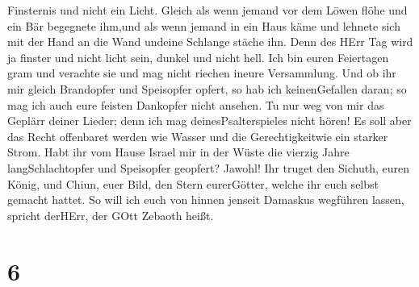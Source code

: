 Finsternis und nicht ein Licht.  Gleich als wenn jemand vor
dem Löwen flöhe und ein Bär begegnete ihm,und als wenn jemand in ein
Haus käme und lehnete sich mit der Hand an die Wand undeine Schlange
stäche ihn.  Denn des HErr Tag wird ja finster und nicht
licht sein, dunkel und nicht hell.  Ich bin euren
Feiertagen gram und verachte sie und mag nicht riechen ineure
Versammlung.  Und ob ihr mir gleich Brandopfer und
Speisopfer opfert, so hab ich keinenGefallen daran; so mag ich auch eure
feisten Dankopfer nicht ansehen.  Tu nur weg von mir das
Geplärr deiner Lieder; denn ich mag deinesPsalterspieles nicht hören!
 Es soll aber das Recht offenbaret werden wie Wasser und
die Gerechtigkeitwie ein starker Strom.  Habt ihr vom Hause
Israel mir in der Wüste die vierzig Jahre langSchlachtopfer und
Speisopfer geopfert? Jawohl!  Ihr truget den Sichuth, euren
König, und Chiun, euer Bild, den Stern eurerGötter, welche ihr euch
selbst gemacht hattet.  So will ich euch von hinnen jenseit
Damaskus wegführen lassen, spricht derHErr, der GOtt Zebaoth heißt.

\hypertarget{section-5}{%
\section{6}\label{section-5}}

